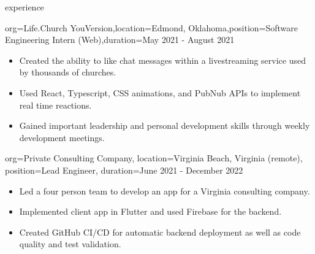 \documentclass{resume}
\begin{document}
\begin{ResumeSection}{experience}
    \begin{ResumeSubsection}{org={Life.Church YouVersion},location={Edmond,
        Oklahoma},position={Software Engineering Intern (Web)},duration={May 2021 - August 2021}}
        \begin{itemize}
            \item {Created the ability to like chat messages within a livestreaming service used by
                thousands of churches.}
            \item {Used React, Typescript, CSS animations, and
                PubNub APIs to implement real time reactions.}
            \item Gained important leadership and personal development skills
                through weekly development meetings.
        \end{itemize}
    \end{ResumeSubsection}

    \begin{ResumeSubsection}{
            org={Private Consulting Company},
            location={Virginia Beach, Virginia (remote)},
            position={Lead Engineer},
            duration={June 2021 - December 2022}
        }
        \begin{itemize}
            \item {Led a four person team to develop an app for a Virginia consulting company.}
            \item {Implemented client app in Flutter and used Firebase for the backend.}
            \item {Created GitHub CI/CD for automatic backend deployment as well as code quality and test validation.}
        \end{itemize}
    \end{ResumeSubsection}



\end{ResumeSection}
\end{document}
